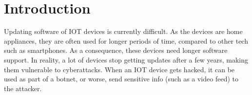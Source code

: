 \chapter{Introduction}
\label{chap:intro}

% 
% 
% 



Updating software of IOT devices is currently difficult. As the devices are home appliances, they are often used for longer periods of time, compared to other tech such as smartphones. As a consequence, these devices need longer software support. In reality, a lot of devices stop getting updates after a few years, making them vulnerable to cyberattacks. When an IOT device gets hacked, it can be used as part of a botnet, or worse, send sensitive info (such as a video feed) to the attacker.

